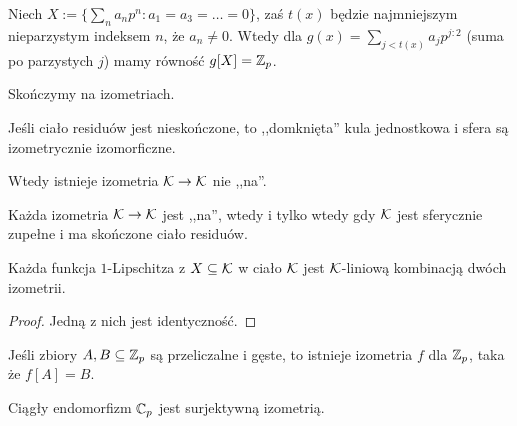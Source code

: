 \begin{przyklad}
	Niech $X := \{\sum_{n} a_n p^n : a_1 = a_3 = \ldots = 0\}$, zaś $t(x)$ będzie najmniejszym nieparzystym indeksem $n$, że $a_n \neq 0$.
	Wtedy dla $g(x) = \sum_{j <t(x)} a_j p^{j:2}$ (suma po parzystych $j$) mamy równość $g[X] = \mathbb Z_p$.
\end{przyklad}

Skończymy na izometriach. %

\begin{fakt}
	Jeśli ciało residuów jest nieskończone, to ,,domknięta'' kula jednostkowa i sfera są izometrycznie izomorficzne.
\end{fakt}

\begin{wniosek}
	Wtedy istnieje izometria $\mathcal K \to \mathcal K$ nie ,,na''.
\end{wniosek}
	
\begin{fakt}
	Każda izometria $\mathcal K \to \mathcal K$ jest ,,na'', wtedy i tylko wtedy gdy $\mathcal K$ jest sferycznie zupełne i ma skończone ciało residuów.
\end{fakt}

\begin{fakt}
	Każda funkcja $1$-Lipschitza z $X \subseteq \mathcal K$ w ciało $\mathcal K$ jest $\mathcal K$-liniową kombinacją dwóch izometrii.
\end{fakt}

\begin{proof}
	Jedną z nich jest identyczność.
\end{proof}

\begin{fakt}
	Jeśli zbiory $A, B \subseteq \mathbb Z_p$ są przeliczalne i gęste, to istnieje izometria $f$ dla $\mathbb Z_p$, taka że $f[A] = B$.
\end{fakt}

\begin{fakt}
	Ciągły endomorfizm $\mathbb C_p$ jest surjektywną izometrią.
\end{fakt}